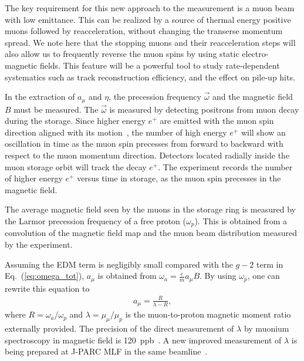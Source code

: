 The key requirement for this new approach to the measurement is a muon beam with low emittance.
This can be realized by a source of 
thermal energy positive muons followed by
reacceleration, without changing the transerse momentum spread. 
We note here that the stopping muons and their reacceleration steps will also
allow us to frequently reverse the muon spins by using static electro-magnetic fields.
This feature will be a powerful tool to study
rate-dependent systematics such as track reconstruction efficiency, and the effect on pile-up hits.

In the extraction of $a_{\mu}$ and $\eta$, 
the precession frequency $\vec{\omega}$ and the magnetic field $B$ must
be measured. The $\vec{\omega}$ is measured by detecting positrons from muon decay during the storage.
Since higher energy $e^+$ are emitted with the muon spin direction 
aligned with its motion~\cite{Konopinski:1959qr}, the number of high energy $e^+$ will show 
an oscillation in time as the muon spin precesses from forward to backward 
with respect to the muon momentum direction.
Detectors located radially inside the muon storage orbit will track the decay
$e^{+}$. The experiment records the number of higher energy $e^{+}$ 
versus time in storage, as the muon spin precesses in the magnetic field.

The average magnetic field seen by the muons in the storage ring 
is measured by the Larmor precession frequency of a free proton ($\omega_p$).
This is obtained from a convolution of the magnetic field map
and the muon beam distribution measured by the experiment.

Assuming the EDM term is negligibly small compared with the $g-2$ term in Eq.~(\ref{eq:omega_tot}), 
$a_\mu$ is obtained from 
$\omega_a = \frac{e}{m} a_\mu B$.
By using $\omega_p$, one can rewrite this equation to
\begin{eqnarray}
a_\mu = \frac{R}{\lambda - R},
\label{eq:amu}
\end{eqnarray}
where $R = \omega_a /\omega_p$ and $\lambda = \mu_\mu/\mu_p$ is the muon-to-proton
magnetic moment ratio externally provided.
The precision of the direct measurement of $\lambda$ by muonium spectroscopy in magnetic field
is 120~ppb~\cite{Liu:1999iz}. 
A new improved measurement of $\lambda$ is being prepared at J-PARC MLF in the same beamline~\cite{Shimomura:2015aza}.

